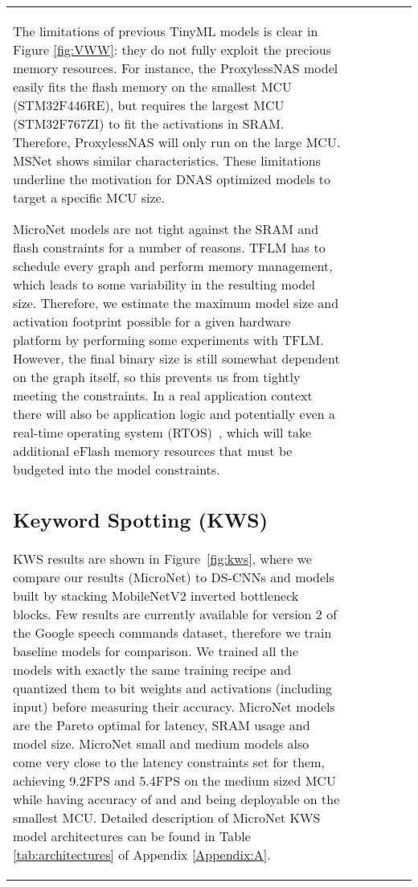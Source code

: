 \documentclass{article}
\begin{document}
\begin{table}[t]
\begin{tabular}{l| c | c | c | c | c}
\begin{figure}[t]
\end{figure}



The limitations of previous TinyML models is clear in Figure \ref{fig:VWW}: they do not fully exploit the precious memory resources.
For instance, the ProxylessNAS model easily fits the flash memory on the smallest MCU (STM32F446RE), but requires the largest MCU (STM32F767ZI) to fit the activations in SRAM.
Therefore, ProxylessNAS will only run on the large MCU.
MSNet shows similar characteristics.
These limitations underline the motivation for DNAS optimized models to target a specific MCU size.



MicroNet models are not tight against the SRAM and flash constraints for a number of reasons.
TFLM has to schedule every graph and perform memory management, which leads to some variability in the resulting model size.  
Therefore, we estimate the maximum model size and activation footprint possible for a given hardware platform by performing some experiments with TFLM.
However, the final binary size is still somewhat dependent on the graph itself, so this prevents us from tightly meeting the constraints.
In a real application context there will also be application logic and potentially even a real-time operating system (RTOS)~\cite{mbed-os}, which will take additional eFlash memory resources that must be budgeted into the model constraints.

\vspace{-5pt}
\subsection{Keyword Spotting (KWS)}
\label{sec:KWS_results}
KWS results are shown in Figure~\ref{fig:kws}, where we compare our results (MicroNet) to DS-CNNs \cite{helloedge} and models built by stacking MobileNetV2 \cite{sandler2018mobilenetv2} inverted bottleneck blocks. Few results are currently available for version 2 of the Google speech commands dataset, therefore we train baseline models for comparison. We trained all the models with exactly the same training recipe and quantized them to bit weights and activations (including input) before measuring their accuracy.  MicroNet models are the Pareto optimal for latency, SRAM usage and model size. 
MicroNet small and medium models also come very close to the latency constraints set for them, achieving 9.2FPS and 5.4FPS on the medium sized MCU while having accuracy of  and  and being deployable on the smallest MCU. Detailed description of MicroNet KWS model architectures can be found in Table \ref{tab:architectures} of Appendix \ref{Appendix:A}. 


\end{tabular}
\end{table}
\end{document}
